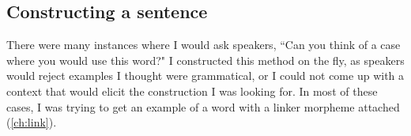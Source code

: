 \subsection{Constructing a sentence}

There were many instances where I would ask speakers, ``Can you think of a case where you would use this word?" I constructed this method on the fly, as speakers would reject examples I thought were grammatical, or I could not come up with a context that would elicit the construction I was looking for. In most of these cases, I was trying to get an example of a word with a linker morpheme attached (\cref{ch:link}).



